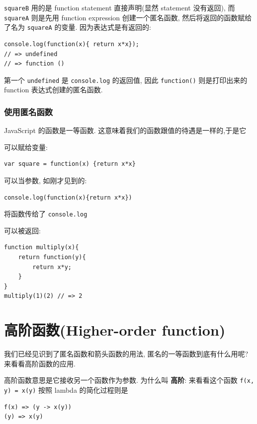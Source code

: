 \documentclass[a5paper]{book}
\begin{document}
\texttt{squareB} 用的是 function statement 直接声明(显然 statement 没有返回),
而 \texttt{squareA} 则是先用 function expression 创建一个匿名函数,
然后将返回的函数赋给了名为 \texttt{squareA} 的变量. 因为表达式是有返回的:

\begin{verbatim}
console.log(function(x){ return x*x});
// => undefined
// => function ()
\end{verbatim}

第一个 \texttt{undefined} 是 \texttt{console.log} 的返回值, 因此
\texttt{function()} 则是打印出来的 function 表达式创建的匿名函数.

\section{使用匿名函数}
\label{sec:orgheadline7}

JavaScript 的函数是一等函数. 这意味着我们的函数跟值的待遇是一样的,于是它

可以赋给变量:

\begin{verbatim}
var square = function(x) {return x*x}
\end{verbatim}

可以当参数, 如刚才见到的:

\begin{verbatim}
console.log(function(x){return x*x})
\end{verbatim}

将函数传给了 \texttt{console.log}

可以被返回:

\begin{verbatim}
function multiply(x){
    return function(y){
        return x*y;
    }
}
multiply(1)(2) // => 2
\end{verbatim}

\part{高阶函数(Higher-order function)}
\label{sec:orgheadline23}

我们已经见识到了匿名函数和箭头函数的用法, 匿名的一等函数到底有什么用呢?
来看看高阶函数的应用.

高阶函数意思是它接收另一个函数作为参数. 为什么叫 \textbf{高阶}: 来看看这个函数
\texttt{f(x, y) = x(y)} 按照 lambda 的简化过程则是

\begin{verbatim}
f(x) => (y -> x(y))
(y) => x(y)
\end{verbatim}
\end{document}
